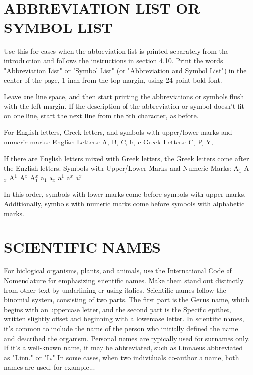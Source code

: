\section{ABBREVIATION LIST OR SYMBOL LIST}

Use this for cases when the abbreviation list is printed separately from the introduction and follows the instructions in section 4.10. Print the words "Abbreviation List" or "Symbol List" (or "Abbreviation and Symbol List") in the center of the page, 1 inch from the top margin, using 24-point bold font.

Leave one line space, and then start printing the abbreviations or symbols flush with the left margin. If the description of the abbreviation or symbol doesn't fit on one line, start the next line from the 8th character, as before.

For English letters, Greek letters, and symbols with upper/lower marks and numeric marks: English Letters: A, B, C, b, c Greek Letters: C, P, Y,...

If there are English letters mixed with Greek letters, the Greek letters come after the English letters. Symbols with Upper/Lower Marks and Numeric Marks: A$_1$ A$_x$ A$^1$ A$^x$ A$_1^x$ a$_1$ a$_x$ a$^1$ a$^x$ a$_1^x$

In this order, symbols with lower marks come before symbols with upper marks. Additionally, symbols with numeric marks come before symbols with alphabetic marks.

\section{SCIENTIFIC NAMES}

For biological organisms, plants, and animals, use the International Code of Nomenclature for emphasizing scientific names. Make them stand out distinctly from other text by underlining or using italics. Scientific names follow the binomial system, consisting of two parts. The first part is the Genus name, which begins with an uppercase letter, and the second part is the Specific epithet, written slightly offset and beginning with a lowercase letter. In scientific names, it's common to include the name of the person who initially defined the name and described the organism. Personal names are typically used for surnames only. If it's a well-known name, it may be abbreviated, such as Linnaeus abbreviated as "Linn." or "L." In some cases, when two individuals co-author a name, both names are used, for example...

